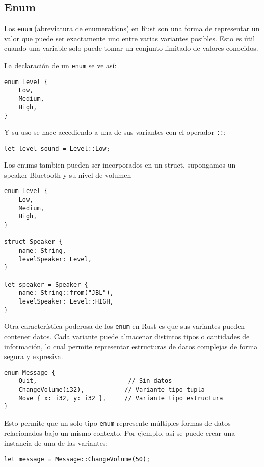\documentclass[12pt]{article}
\begin{document}
\subsection{Enum}

Los \texttt{enum} (abreviatura de enumerations) en Rust son una forma de representar un valor que puede ser exactamente uno entre varias variantes posibles. Esto es útil cuando una variable solo puede tomar un conjunto limitado de valores conocidos.

La declaración de un \texttt{enum} se ve así:

\begin{lstlisting}[style=ruststyle]
enum Level {
	Low,
	Medium,
	High,
}
\end{lstlisting}

Y su uso se hace accediendo a una de sus variantes con el operador \texttt{::}:

\begin{lstlisting}[style=ruststyle]
let level_sound = Level::Low;
\end{lstlisting}

Los enums tambien pueden ser incorporados en un struct, supongamos un speaker Bluetooth y su nivel de volumen

\begin{lstlisting}[style=ruststyle]
enum Level {
	Low,
	Medium,
	High,
}

struct Speaker {
	name: String,
	levelSpeaker: Level, 
}

let speaker = Speaker {
	name: String::from("JBL"),
	levelSpeaker: Level::HIGH,
}
\end{lstlisting}
Otra característica poderosa de los \texttt{enum} en Rust es que sus variantes pueden contener datos. Cada variante puede almacenar distintos tipos o cantidades de información, lo cual permite representar estructuras de datos complejas de forma segura y expresiva.

\begin{lstlisting}[style=ruststyle]
enum Message {
	Quit,                         // Sin datos
	ChangeVolume(i32),           // Variante tipo tupla
	Move { x: i32, y: i32 },     // Variante tipo estructura
}
\end{lstlisting}

Esto permite que un solo tipo \texttt{enum} represente múltiples formas de datos relacionados bajo un mismo contexto. Por ejemplo, así se puede crear una instancia de una de las variantes:

\begin{lstlisting}[style=ruststyle]
let message = Message::ChangeVolume(50);
\end{lstlisting}
\end{document}
